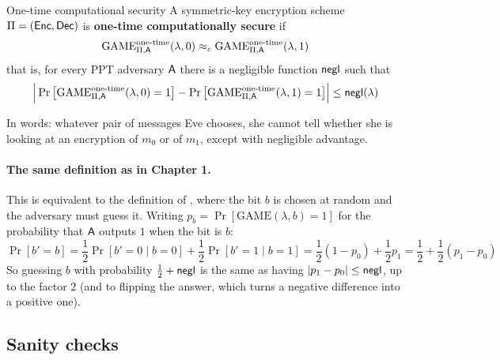 \begin{center}
\end{center}

\begin{frameddefn}[label={def:one-time-security}]{One-time computational security}
  A symmetric-key encryption scheme $\Pi = (\mathsf{Enc}, \mathsf{Dec})$ is \textbf{one-time computationally secure} if
  \[
    \mathrm{GAME}^{\text{one-time}}_{\Pi,\mathsf{A}}(\lambda, 0) \approx_c \mathrm{GAME}^{\text{one-time}}_{\Pi,\mathsf{A}}(\lambda, 1)
  \]
  that is, for every PPT adversary $\mathsf{A}$ there is a negligible function $\mathsf{negl}$ such that
  \[
    \Big|\Pr\big[\mathrm{GAME}^{\text{one-time}}_{\Pi,\mathsf{A}}(\lambda, 0) = 1\big] - \Pr\big[\mathrm{GAME}^{\text{one-time}}_{\Pi,\mathsf{A}}(\lambda, 1) = 1\big]\Big| \leq \mathsf{negl}(\lambda)
  \]
\end{frameddefn}

In words: whatever pair of messages Eve chooses, she cannot tell whether she is looking at an encryption of $m_0$ or of $m_1$, except with negligible advantage.

\paragraph{The same definition as in Chapter 1.} This is equivalent to the definition of , where the bit $b$ is chosen at random and the adversary must guess it. Writing $p_b = \Pr[\mathrm{GAME}(\lambda, b) = 1]$ for the probability that $\mathsf{A}$ outputs $1$ when the bit is $b$:
\[
  \Pr[b' = b] = \frac{1}{2}\Pr[b' = 0 \mid b = 0] + \frac{1}{2}\Pr[b' = 1 \mid b = 1] = \frac{1}{2}(1 - p_0) + \frac{1}{2}p_1 = \frac{1}{2} + \frac{1}{2}(p_1 - p_0)
\]
So guessing $b$ with probability $\frac{1}{2} + \mathsf{negl}$ is the same as having $|p_1 - p_0| \leq \mathsf{negl}$, up to the factor $2$ (and to flipping the answer, which turns a negative difference into a positive one).

\subsection{Sanity checks}

